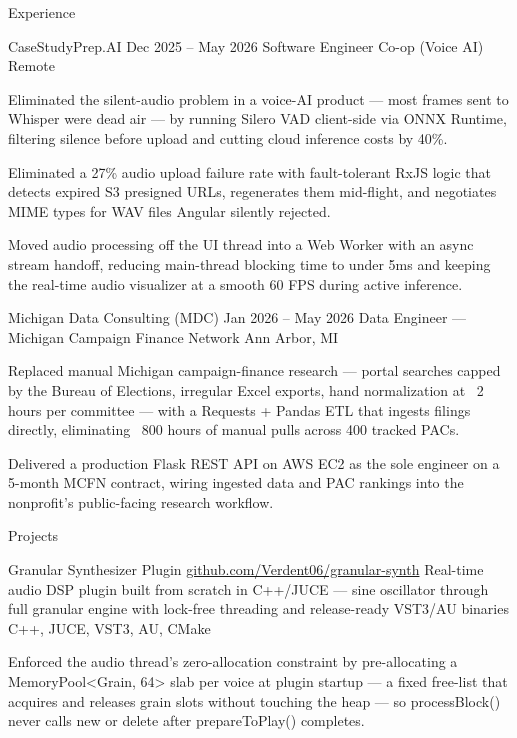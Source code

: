 \documentclass[
	11pt
]{../../template}
\begin{document}
\begin{rSection}{E}{xperience}
		\begin{rSectionEntry}
			{CaseStudyPrep.AI}
			{Dec 2025 -- May 2026}
			{Software Engineer Co-op (Voice AI)}
			{}
			{Remote}

			\item Eliminated the silent-audio problem in a voice-AI product --- most frames sent to Whisper were dead air --- by running Silero VAD client-side via ONNX Runtime, filtering silence before upload and cutting cloud inference costs by 40\%.
			\item Eliminated a 27\% audio upload failure rate with fault-tolerant RxJS logic that detects expired S3 presigned URLs, regenerates them mid-flight, and negotiates MIME types for WAV files Angular silently rejected.
			\item Moved audio processing off the UI thread into a Web Worker with an async stream handoff, reducing main-thread blocking time to under 5ms and keeping the real-time audio visualizer at a smooth 60 FPS during active inference.
		\end{rSectionEntry}

		\begin{rSectionEntry}
			{Michigan Data Consulting (MDC)}
			{Jan 2026 -- May 2026}
			{Data Engineer --- Michigan Campaign Finance Network}
			{}
			{Ann Arbor, MI}

			\item Replaced manual Michigan campaign-finance research --- portal searches capped by the Bureau of Elections, irregular Excel exports, hand normalization at ~2 hours per committee --- with a Requests + Pandas ETL that ingests filings directly, eliminating ~800 hours of manual pulls across 400 tracked PACs.
			\item Delivered a production Flask REST API on AWS EC2 as the sole engineer on a 5-month MCFN contract, wiring ingested data and PAC rankings into the nonprofit's public-facing research workflow.
		\end{rSectionEntry}
	\end{rSection}

	\begin{rSection}{P}{rojects}
		\begin{rSectionEntry}
			{Granular Synthesizer Plugin}
			{\href{https://github.com/Verdent06/granular-synth}{github.com/Verdent06/granular-synth}}
			{Real-time audio DSP plugin built from scratch in C++/JUCE --- sine oscillator through full granular engine with lock-free threading and release-ready VST3/AU binaries}
			{C++, JUCE, VST3, AU, CMake}
			{}

			\item Enforced the audio thread's zero-allocation constraint by pre-allocating a MemoryPool<Grain, 64> slab per voice at plugin startup --- a fixed free-list that acquires and releases grain slots without touching the heap --- so processBlock() never calls new or delete after prepareToPlay() completes.
		\end{rSectionEntry}
	\end{rSection}
\end{document}
